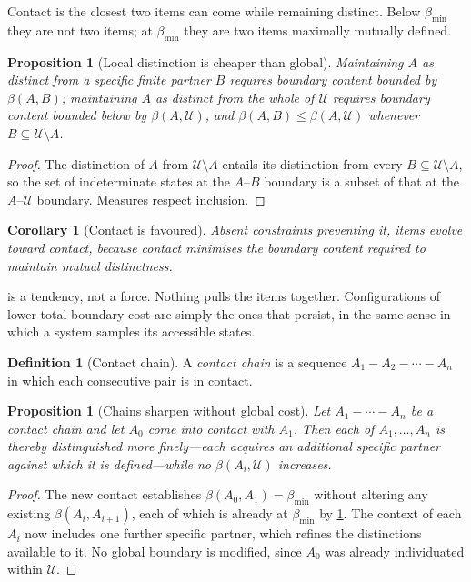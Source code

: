 \documentclass[11pt,twocolumn,a4paper]{article}
\theoremstyle{plain}
\newtheorem{proposition}[theorem]{Proposition}
\newtheorem{corollary}[theorem]{Corollary}
\theoremstyle{definition}
\newtheorem{definition}[theorem]{Definition}
\theoremstyle{remark}
\newcommand{\Univ}{\mathcal{U}}
\newcommand{\thick}{\beta}
\newcommand{\floor}{\thick_{\min}}
\begin{document}
Contact is the closest two items can come while remaining distinct. Below
$\floor$ they are not two items; at $\floor$ they are two items maximally
mutually defined.

\begin{proposition}[Local distinction is cheaper than global]
\label{prop:local-cheaper}
Maintaining $A$ as distinct from a specific finite partner $B$ requires boundary
content bounded by $\thick(A,B)$; maintaining $A$ as distinct from the whole of
$\Univ$ requires boundary content bounded below by $\thick(A,\Univ)$, and
$\thick(A,B) \leq \thick(A,\Univ)$ whenever $B \subseteq \Univ\setminus A$.
\end{proposition}

\begin{proof}
The distinction of $A$ from $\Univ\setminus A$ entails its distinction from
every $B \subseteq \Univ\setminus A$, so the set of indeterminate states at the
$A$--$B$ boundary is a subset of that at the $A$--$\Univ$ boundary. Measures
respect inclusion.
\end{proof}

\begin{corollary}[Contact is favoured]
\label{cor:contact-favoured}
Absent constraints preventing it, items evolve toward contact, because contact
minimises the boundary content required to maintain mutual distinctness.
\end{corollary}

 is a tendency, not a force. Nothing pulls the items
together. Configurations of lower total boundary cost are simply the ones that
persist, in the same sense in which a system samples its accessible states.

\begin{definition}[Contact chain]
\label{def:chain}
A \emph{contact chain} is a sequence $A_1 - A_2 - \cdots - A_n$ in which each
consecutive pair is in contact.
\end{definition}

\begin{proposition}[Chains sharpen without global cost]
\label{prop:chain}
Let $A_1-\cdots-A_n$ be a contact chain and let $A_0$ come into contact with
$A_1$. Then each of $A_1,\dots,A_n$ is thereby distinguished more finely---each
acquires an additional specific partner against which it is defined---while no
$\thick(A_i, \Univ)$ increases.
\end{proposition}

\begin{proof}
The new contact establishes $\thick(A_0,A_1) = \floor$ without altering any
existing $\thick(A_i,A_{i+1})$, each of which is already at $\floor$ by
\cref{def:chain}. The context of each $A_i$ now includes one further specific
partner, which refines the distinctions available to it. No global boundary is
modified, since $A_0$ was already individuated within $\Univ$.
\end{proof}
\end{document}
